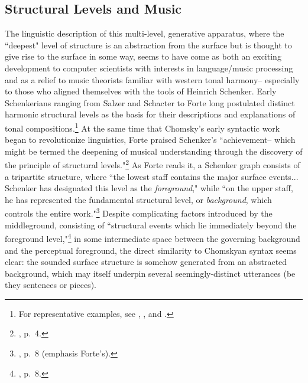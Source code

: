 \subsection{Structural Levels and Music}
The linguistic description of this multi-level, generative apparatus, where the ``deepest" level of structure is an abstraction from the surface but is thought to give rise to the surface in some way, seems to have come as both an exciting development to computer scientists with interests in language/music processing and as a relief to music theorists familiar with western tonal harmony-- especially to those who aligned themselves with the tools of Heinrich Schenker.  Early Schenkerians ranging from Salzer and Schacter to Forte long postulated distinct harmonic structural levels as the basis for their descriptions and explanations of tonal compositions.\footnote{For representative examples, see \cite{salzer1969}, \cite{forte1959}, and \cite{forte1982}.}   At the same time that Chomsky's early syntactic work began to revolutionize linguistics, Forte praised Schenker's ``achievement-- which might be termed the deepening of musical understanding through the discovery of the principle of structural levels."\footnote{\cite{forte1959}, p.\ 4.}  As Forte reads it, a Schenker graph consists of a tripartite structure, where ``the lowest staff contains the major surface events... Schenker has designated this level as the \emph{foreground}," while ``on the upper staff, he has represented the fundamental structural level, or \emph{background}, which controls the entire work."\footnote{\cite{forte1959}, p.\ 8 (emphasis Forte's).}  Despite complicating factors introduced by the middleground, consisting of ``structural events which lie immediately beyond the foreground level,"\footnote{\cite{forte1959}, p.\ 8.} in some intermediate space between the governing background and the perceptual foreground, the direct similarity to Chomskyan syntax seems clear: the sounded surface structure is somehow generated from an abstracted background, which may itself underpin several seemingly-distinct utterances (be they sentences or pieces).

